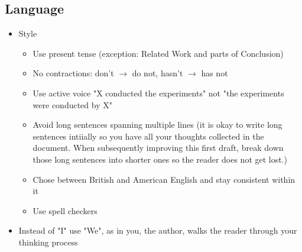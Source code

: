 \documentclass[nodate]{proc}
\begin{document}
\subsection{Language}
\begin{itemize}

	\item Style
	\begin{itemize}
		\item Use present tense (exception: Related Work and parts of Conclusion)
		\item No contractions: don't $\rightarrow$ do not, hasn't $\rightarrow$ has not
		\item Use active voice "X conducted the experiments" not "the experiments were conducted by X"
		\item Avoid long sentences spanning multiple lines (it is okay to write long sentences intiially so you have all your thoughts collected in the document. When subsequently improving this first draft, break down those long sentences into shorter ones so the reader does not get lost.)
		\item Chose between British and American English and stay consistent within it
		\item Use spell checkers
	\end{itemize}
	\item Instead of "I" use "We", as in you, the author, walks the reader through your thinking process
\end{itemize}
\end{document}
